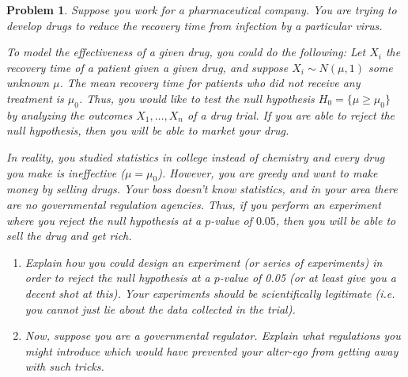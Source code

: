 \documentclass{article}
\newtheorem{problem}{Problem}
\begin{document}
\clearpage
\begin{problem}
Suppose you work for a pharmaceutical company.
You are trying to develop drugs to reduce the recovery time from infection by a particular virus.

To model the effectiveness of a given drug, you could do the following:
    Let $X_i$ the recovery time of a patient given a given drug, and suppose $X_i\sim N(\mu,1)$ some unknown $\mu$.
    The mean recovery time for patients who did not receive any treatment is $\mu_0$. Thus, you would like to test the null hypothesis $H_0 = \{ \mu \geq \mu_0 \}$ by analyzing the outcomes $X_1, \ldots, X_n$ of a drug trial.
    If you are able to reject the null hypothesis, then you will be able to market your drug.

    In reality, you studied statistics in college instead of chemistry and every drug you make is ineffective ($\mu = \mu_0$).
    However, you are greedy and want to make money by selling drugs. 
    Your boss doesn't know statistics, and in your area there are no governmental regulation agencies.
    Thus, if you perform an experiment where you reject the null hypothesis at a $p$-value of $0.05$, then you will be able to sell the drug and get rich.
    
    \begin{enumerate}[label=(\alph*),topsep=0pt]
        \item Explain how you could design an experiment (or series of experiments) in order to reject the null hypothesis at a $p$-value of 0.05 (or at least give you a decent shot at this).
            Your experiments should be scientifically legitimate (i.e. you cannot just lie about the data collected in the trial).

        \item Now, suppose you are a governmental regulator. 
            Explain what regulations you might introduce which would have prevented your alter-ego from getting away with such tricks.
    
    \end{enumerate}

\end{problem}
\end{document}
